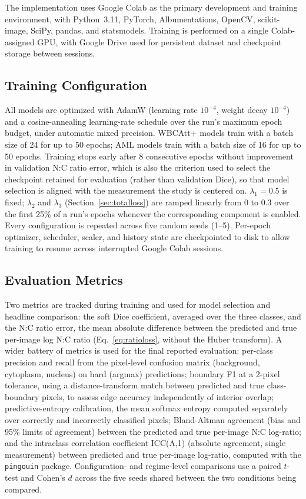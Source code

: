 \documentclass[pdflatex,sn-mathphys-num]{sn-jnl}%
\theoremstyle{thmstyleone}%
\theoremstyle{thmstyletwo}%
\theoremstyle{thmstylethree}%
\begin{document}
The implementation uses Google Colab as the primary development and training environment, with Python~3.11, PyTorch, Albumentations, OpenCV, scikit-image, SciPy, pandas, and statsmodels. Training is performed on a single Colab-assigned GPU, with Google Drive used for persistent dataset and checkpoint storage between sessions.

\subsection{Training Configuration}

All models are optimized with AdamW (learning rate $10^{-4}$, weight decay $10^{-4}$) and a cosine-annealing learning-rate schedule over the run's maximum epoch budget, under automatic mixed precision. WBCAtt+ models train with a batch size of 24 for up to 50 epochs; AML models train with a batch size of 16 for up to 50 epochs. Training stops early after 8 consecutive epochs without improvement in validation N:C ratio error, which is also the criterion used to select the checkpoint retained for evaluation (rather than validation Dice), so that model selection is aligned with the measurement the study is centered on. $\lambda_1=0.5$ is fixed; $\lambda_2$ and $\lambda_3$ (Section~\ref{sec:totalloss}) are ramped linearly from 0 to 0.3 over the first 25\% of a run's epochs whenever the corresponding component is enabled. Every configuration is repeated across five random seeds (1--5). Per-epoch optimizer, scheduler, scaler, and history state are checkpointed to disk to allow training to resume across interrupted Google Colab sessions.

\subsection{Evaluation Metrics}

Two metrics are tracked during training and used for model selection and headline comparison: the soft Dice coefficient, averaged over the three classes, and the N:C ratio error, the mean absolute difference between the predicted and true per-image log N:C ratio (Eq.~\eqref{eq:ratioloss}, without the Huber transform). A wider battery of metrics is used for the final reported evaluation: per-class precision and recall from the pixel-level confusion matrix (background, cytoplasm, nucleus) on hard (argmax) predictions; boundary F1 at a 2-pixel tolerance, using a distance-transform match between predicted and true class-boundary pixels, to assess edge accuracy independently of interior overlap; predictive-entropy calibration, the mean softmax entropy computed separately over correctly and incorrectly classified pixels; Bland-Altman agreement (bias and 95\% limits of agreement) between the predicted and true per-image N:C log-ratio; and the intraclass correlation coefficient ICC(A,1) (absolute agreement, single measurement) between predicted and true per-image log-ratio, computed with the \texttt{pingouin} package. Configuration- and regime-level comparisons use a paired $t$-test and Cohen's $d$ across the five seeds shared between the two conditions being compared.
\end{document}
